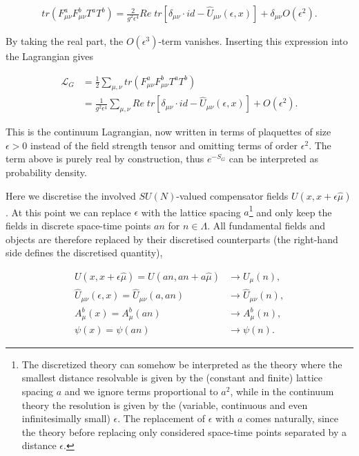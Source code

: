 \documentclass{article}
\theoremstyle{plain} %
\theoremstyle{convention} %
\theoremstyle{remark} %
\numberwithin{equation}{section}
\begin{document}
\begin{align*}
    tr( F_{\mu \nu}^a F_{\mu \nu}^b T^a T^b) = \frac{2}{g^2 \epsilon^4} Re \; tr\left[ \delta_{\mu \nu} \cdot id - \hat{U}_{\mu \nu}(\epsilon,x) \right] + \delta_{\mu \nu} O(\epsilon^{2}).
\end{align*}

 By taking the real part, the $O(\epsilon^3)$-term vanishes. Inserting this expression into the Lagrangian gives

\begin{align*}
    \mathcal{L}_G &= \frac{1}{2} \sum_{\mu, \nu} tr( F_{\mu \nu}^a F_{\mu \nu}^b T^a T^b) \\
    &= \frac{1}{g^2 \epsilon^4} \sum_{\mu, \nu} Re \; tr\left[ \delta_{\mu \nu} \cdot id - \hat{U}_{\mu \nu}(\epsilon,x) \right] + O(\epsilon^{2}).
\end{align*}

This is the continuum Lagrangian, now written in terms of plaquettes of size $\epsilon > 0$ instead of the field strength tensor and omitting terms of order $\epsilon^2$. The term above is purely real by construction, thus $e^{-S_G}$ can be interpreted as probability density.

Here we discretise the involved $SU(N)$-valued compensator fields $U(x,x+\epsilon \hat{\mu})$. At this point we can replace $\epsilon$ with the lattice spacing $a$\footnote{The discretized theory can somehow be interpreted as the theory where the smallest distance resolvable is given by the (constant and finite) lattice spacing $a$ and we ignore terms proportional to $a^2$, while in the continuum theory the resolution is given by the (variable, continuous and even infinitesimally small) $\epsilon$. The replacement of $\epsilon$ with $a$ comes naturally, since the theory before replacing only considered space-time points separated by a distance $\epsilon$.} and only keep the fields in discrete space-time points $an$ for $n \in \Lambda$. All fundamental fields and objects are therefore replaced by their discretised counterparts (the right-hand side defines the discretised quantity),

\begin{align*}
    U(x,x + \epsilon \hat{\mu}) = U(an,an + a\hat{\mu}) &\longrightarrow U_{\mu}(n), \\
    \hat{U}_{\mu \nu}(\epsilon, x) = \hat{U}_{\mu \nu}(a, an) &\longrightarrow \hat{U}_{\mu \nu}(n), \\
    A_{\mu}^b(x) = A_{\mu}^b(an) &\longrightarrow A_{\mu}^b(n), \\
    \psi(x) = \psi(an) &\longrightarrow \psi(n).
\end{align*}
\end{document}
